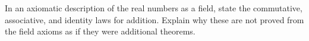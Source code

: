 In an axiomatic description of the real numbers as a field, state the commutative, associative, and identity laws for addition. Explain why these are not proved from the field axioms as if they were additional theorems.
